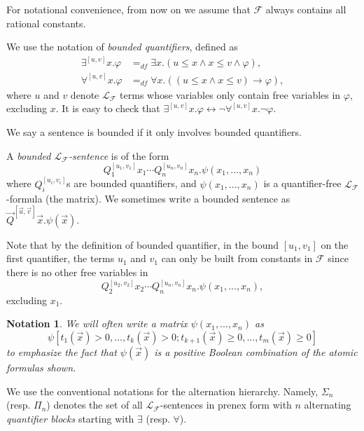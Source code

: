 \documentclass[envcountsect]{llncs}
\newtheorem{notation}[theorem]{Notation}
\begin{document}
For notational convenience, from now on we assume that $\mathcal{F}$ always 
contains all rational constants. 

\begin{definition}
We use the notation of {\em bounded quantifiers}, defined as
\begin{align*}
\exists^{[u,v]}x.\varphi &=_{df}\exists x. ( u \leq x \land x \leq v \wedge 
\varphi),\\
\forall^{[u,v]}x.\varphi &=_{df} \forall x. ( (u \leq x \land x \leq v) 
\rightarrow \varphi),
\end{align*}
where $u$ and $v$ denote $\mathcal{L}_{\mathcal{F}}$ terms whose variables only
contain free variables in $\varphi$, excluding $x$. It is easy to check that
$\exists^{[u,v]}x. \varphi \leftrightarrow \neg \forall^{[u,v]}x. \neg\varphi$. 
\end{definition}

We say a sentence is bounded if it only involves bounded quantifiers. 

\begin{definition}
A {\em bounded $\mathcal{L}_{\mathcal{F}}$-sentence} is of the form
$$Q_1^{[u_1,v_1]}x_1\cdots Q_n^{[u_n,v_n]}x_n. \psi(x_1,...,x_n)$$
where $Q_i^{[u_i,v_i]}$s are bounded quantifiers, and $\psi(x_1,...,x_n)$ is a 
quantifier-free $\mathcal{L}_{\mathcal{F}}$-formula (the matrix). We sometimes
write a bounded sentence as $\vec Q^{[\vec u,\vec v]}\vec x.\psi(\vec x)$. 
 
\end{definition}

\begin{remark} Note that by the definition of bounded quantifier, in the bound 
$[u_1,v_1]$ on the first quantifier, the terms $u_1$ and $v_1$ can only be built
from constants in $\mathcal{F}$ since there is no other free variables in 
$$Q_2^{[u_2,v_2]}x_2\cdots Q_n^{[u_n,v_n]}x_n.\psi(x_1,...,x_n),$$ excluding $x_1$. 
\end{remark}


\begin{notation}
We will often write a matrix $\psi(x_1,...,x_n)$ as 
$$\psi[t_1(\vec x)>0,...,t_k(\vec x)>0; t_{k+1}(\vec x)\geq 0,...,t_m(\vec
x)\geq 0]$$
to emphasize the fact that $\psi(\vec x)$ is a positive Boolean combination of
the atomic formulas shown. 
\end{notation}

We use the conventional notations for the alternation hierarchy. Namely,
$\Sigma_n$  (resp. $\Pi_n$) denotes the set of all
$\mathcal{L}_{\mathcal{F}}$-sentences in prenex form with $n$ alternating {\em
quantifier blocks} starting with $\exists$ (resp. $\forall$). 
\end{document}
